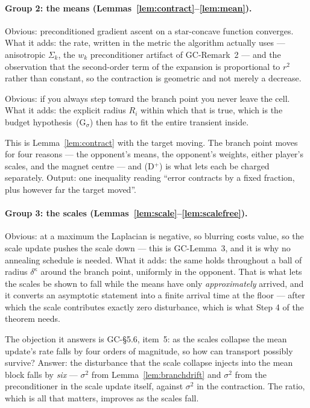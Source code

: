 \documentclass[11pt]{article}
\theoremstyle{definition}
\newcommand{\GC}[1]{\textsf{GC-#1}}
\begin{document}
\paragraph{Group 2: the means (Lemmas~\ref{lem:contract}--\ref{lem:mean}).}
\begin{description}[leftmargin=0pt, style=unboxed, font=\normalfont\itshape]
\item[Lemma~\ref{lem:contract}.] Obvious: preconditioned gradient ascent on a
  star-concave function converges. What it adds: the rate, written in the metric
  the algorithm actually uses --- anisotropic $\Sigma_k$, the $w_k$ preconditioner
  artifact of \GC{Remark~2} --- and the observation that the second-order term of
  the expansion is proportional to $r^2$ rather than constant, so the contraction
  is geometric and not merely a decrease.
\item[Lemma~\ref{lem:inv}.] Obvious: if you always step toward the branch point
  you never leave the cell. What it adds: the explicit radius $R_i$ within which
  that is true, which is the budget hypothesis~(G$_\sigma$) then has to fit the
  entire transient inside.
\item[Lemma~\ref{lem:mean}.] This is Lemma~\ref{lem:contract} with the target
  moving. The branch point moves for four reasons --- the opponent's means, the
  opponent's weights, either player's scales, and the magnet centre --- and
  (D$^+$) is what lets each be charged separately. Output: one inequality reading
  ``error contracts by a fixed fraction, plus however far the target moved''.
\end{description}

\paragraph{Group 3: the scales (Lemmas~\ref{lem:scale}--\ref{lem:scalefree}).}
\begin{description}[leftmargin=0pt, style=unboxed, font=\normalfont\itshape]
\item[Lemma~\ref{lem:scale}.] Obvious: at a maximum the Laplacian is negative, so
  blurring costs value, so the scale update pushes the scale down --- this is
  \GC{Lemma~3}, and it is why no annealing schedule is needed. What it adds: the
  same holds throughout a ball of radius $\delta^\kappa$ around the branch point,
  uniformly in the opponent. That is what lets the scales be shown to fall while
  the means have only \emph{approximately} arrived, and it converts an asymptotic
  statement into a finite arrival time at the floor --- after which the scale
  contributes exactly zero disturbance, which is what Step 4 of the theorem needs.
\item[Lemma~\ref{lem:scalefree}.] The objection it answers is \GC{\S5.6},
  item~5: as the scales collapse the mean update's rate falls by four orders of
  magnitude, so how can transport possibly survive? Answer: the disturbance that
  the scale collapse injects into the mean block falls by \emph{six} --- $\sigma^2$
  from Lemma~\ref{lem:branchdrift} and $\sigma^2$ from the preconditioner in the
  scale update itself, against $\sigma^2$ in the contraction. The ratio, which is
  all that matters, improves as the scales fall.
\end{description}
\end{document}
